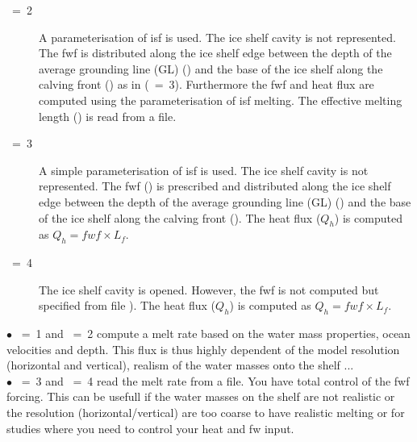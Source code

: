\documentclass[NEMO_book]{subfiles}
\begin{document}
\begin{description}
\item[~=~2]
A parameterisation of isf is used. The ice shelf cavity is not represented. 
The fwf is distributed along the ice shelf edge between the depth of the average grounding line (GL)
() and the base of the ice shelf along the calving front () as in (~=~3). 
Furthermore the fwf and heat flux are computed using the \citet{Beckmann2003} parameterisation of isf melting. 
The effective melting length () is read from a file.

\item[~=~3]
A simple parameterisation of isf is used. The ice shelf cavity is not represented. 
The fwf () is prescribed and distributed along the ice shelf edge between the depth of the average grounding line (GL)
() and the base of the ice shelf along the calving front (). 
The heat flux ($Q_h$) is computed as $Q_h = fwf \times L_f$.

\item[~=~4]
The ice shelf cavity is opened. However, the fwf is not computed but specified from file ). 
The heat flux ($Q_h$) is computed as $Q_h = fwf \times L_f$.\\
\end{description}


$\bullet$ ~=~1 and ~=~2 compute a melt rate based on the water mass properties, ocean velocities and depth.
 This flux is thus highly dependent of the model resolution (horizontal and vertical), realism of the water masses onto the shelf ...\\

$\bullet$ ~=~3 and ~=~4 read the melt rate from a file. You have total control of the fwf forcing.
This can be usefull if the water masses on the shelf are not realistic or the resolution (horizontal/vertical) are too 
coarse to have realistic melting or for studies where you need to control your heat and fw input.\\ 
\end{document}
